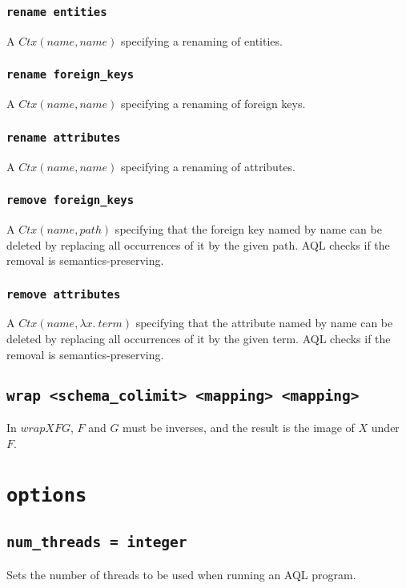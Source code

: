 \documentclass[10pt]{book}
\begin{document}
\subsection{{\tt rename entities}}
A $Ctx(name,name)$ specifying a renaming of entities.

\subsection{{\tt rename foreign\_keys}}
A $Ctx(name,name)$ specifying a renaming of foreign keys. 

\subsection{{\tt rename attributes}}

A $Ctx(name,name)$ specifying a renaming of attributes. 

\subsection{{\tt remove foreign\_keys}}

A $Ctx(name,path)$ specifying that the foreign key named by name can be deleted by replacing all occurrences of it by the given path.  AQL checks if the removal is semantics-preserving. 

\subsection{{\tt remove attributes}}

A $Ctx(name,\lambda x. \ term)$ specifying that the attribute named by name can be deleted by replacing all occurrences of it by the given term.  AQL checks if the removal is semantics-preserving. 
		
\section{{\tt wrap <schema\_colimit> <mapping> <mapping>}}
In $wrap X F G$, $F$ and $G$ must be inverses, and the result is the image of $X$ under $F$.
		
\chapter{{\tt options}}

\section{{\tt num\_threads = integer}}
Sets the number of threads to be used when running an AQL program.
\end{document}
